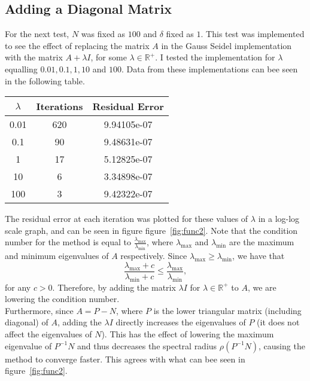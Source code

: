 \documentclass[10pt]{article}
\begin{document}
\subsection{Adding a Diagonal Matrix}
For the next test, $N$ was fixed as $100$ and $\delta$ fixed as $1$. This test was implemented to see the effect of replacing the matrix $A$ in the Gauss Seidel implementation with the matrix $A+\lambda I$, for some $\lambda \in \mathbb{R}^+$. I tested the implementation for $\lambda$ equalling $0.01,0.1,1,10$ and $100$. Data from these implementations can bee seen in the following table.
\begin{center}
 \begin{tabular}{||c c c ||}
 \hline
 $\lambda$ & Iterations & Residual Error \\ [0.5ex]
 \hline\hline
 0.01 & 620 & 9.94105e-07  \\
 \hline
 0.1 & 90 & 9.48631e-07  \\
 \hline
 1 & 17 & 5.12825e-07 \\
 \hline
 10 & 6 & 3.34898e-07 \\
 \hline
 100 & 3 & 9.42322e-07 \\
 \hline
\end{tabular}
\end{center}

The residual error at each iteration was plotted for these values of $\lambda$ in a log-log scale graph, and can be seen in figure figure~\ref{fig:func2}. Note that the condition number for the method is equal to $\frac{\lambda_{\text{max}}}{\lambda_{\text{min}}}$, where $\lambda_\text{max}$ and $\lambda_\text{min}$ are the maximum and minimum eigenvalues of $A$ respectively. Since $\lambda_\text{max} \geq \lambda_\text{min}$, we have that
\[\frac{\lambda_{\text{max}}+c}{\lambda_{\text{min}}+c} \leq \frac{\lambda_{\text{max}}}{\lambda_{\text{min}}},\]
for any $c>0$. Therefore, by adding the matrix $\lambda I$ for $\lambda \in \mathbb{R}^+$ to $A$, we are lowering the condition number. \\

Furthermore, since $A = P - N$, where $P$ is the lower triangular matrix (including diagonal) of $A$, adding the $\lambda I$ directly increases the eigenvalues of $P$ (it does not affect the eigenvalues of $N$). This has the effect of lowering the maximum eigenvalue of $P^{-1}N$ and thus decreases the spectral radius $\rho(P^{-1}N)$, causing the method to converge faster. This agrees with what can bee seen in figure~\ref{fig:func2}.
\end{document}
